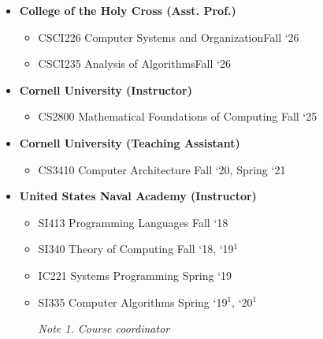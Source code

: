 \documentclass[11pt]{article}
\begin{document}
\begin{itemize}
\item[] \textbf{College of the Holy Cross (Asst. Prof.)}

\begin{itemize}
\item[] CSCI226 Computer Systems and Organization\hfill{Fall `26}
\item[] CSCI235 Analysis of Algorithms\hfill{Fall `26}
\end{itemize}

\item[] \textbf{Cornell University (Instructor)}

\begin{itemize}
\item[] CS2800 Mathematical Foundations of Computing \hfill{Fall `25}
\end{itemize}

\item[] \textbf{Cornell University (Teaching Assistant)}

\begin{itemize}
\item[] CS3410 Computer Architecture          \hfill{Fall `20, Spring `21}
\end{itemize}

\item[] \textbf{United States Naval Academy (Instructor)}

\begin{itemize}
\item[] SI413 Programming Languages        \hfill{Fall `18}
\item[] SI340 Theory of Computing          \hfill{Fall `18, `19$^1$}
\item[] IC221 Systems Programming          \hfill{Spring `19}
\item[] SI335 Computer Algorithms          \hfill{Spring `19$^1$, `20$^1$}

\textit{Note 1. Course coordinator}
\end{itemize}
\end{itemize}

\end{document}
